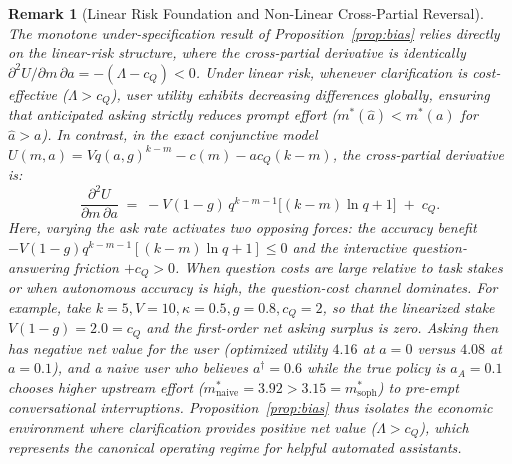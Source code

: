 \documentclass[11pt]{article}
\newtheorem{remark}{Remark}
\begin{document}
\begin{remark}[Linear Risk Foundation and Non-Linear Cross-Partial Reversal]
\label{rmk:prop2-counterexample}
The monotone under-specification result of Proposition~\ref{prop:bias} relies directly on the linear-risk structure, where the cross-partial derivative is identically $\partial^2 U / \partial m\,\partial a = -(\Lambda - c_Q) < 0$. Under linear risk, whenever clarification is cost-effective ($\Lambda > c_Q$), user utility exhibits decreasing differences globally, ensuring that anticipated asking strictly reduces prompt effort ($m^*(\hat a) < m^*(a)$ for $\hat a > a$).
In contrast, in the exact conjunctive model $U(m,a) = V q(a,g)^{k-m} - c(m) - a c_Q (k-m)$, the cross-partial derivative is:
\[
\frac{\partial^2 U}{\partial m\,\partial a} \;=\; -V(1-g)\,q^{k-m-1}\big[(k-m)\ln q + 1\big] \;+\; c_Q.
\]
Here, varying the ask rate activates two opposing forces: the accuracy benefit $-V(1-g)q^{k-m-1}[(k-m)\ln q + 1] \le 0$ and the interactive question-answering friction $+c_Q > 0$. When question costs are large relative to task stakes or when autonomous accuracy is high, the question-cost channel dominates. For example, take $k=5, V=10, \kappa=0.5, g=0.8, c_Q=2$, so that the linearized stake $V(1-g) = 2.0 = c_Q$ and the first-order net asking surplus is zero. Asking then has negative net value for the user (optimized utility $4.16$ at $a = 0$ versus $4.08$ at $a = 0.1$), and a naive user who believes $a^\dagger = 0.6$ while the true policy is $a_A = 0.1$ chooses \emph{higher} upstream effort ($m^*_{\text{naive}} = 3.92 > 3.15 = m^*_{\text{soph}}$) to pre-empt conversational interruptions. Proposition~\ref{prop:bias} thus isolates the economic environment where clarification provides positive net value ($\Lambda > c_Q$), which represents the canonical operating regime for helpful automated assistants.
\end{remark}
\end{document}
